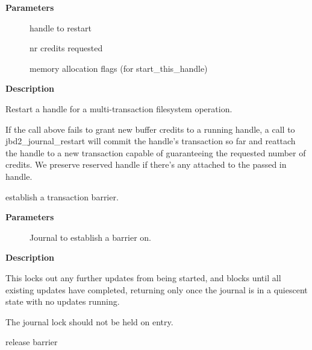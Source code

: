 \documentclass[a4paper,8pt,english]{sphinxmanual}
\begin{document}
\textbf{Parameters}
\begin{description}
\item[{}] \leavevmode
handle to restart

\item[{}] \leavevmode
nr credits requested

\item[{}] \leavevmode
memory allocation flags (for start\_this\_handle)

\end{description}

\textbf{Description}

Restart a handle for a multi-transaction filesystem
operation.

If the {\hyperref[filesystems/index:c.jbd2_journal_extend]{\emph{}}} call above fails to grant new buffer credits
to a running handle, a call to jbd2\_journal\_restart will commit the
handle's transaction so far and reattach the handle to a new
transaction capable of guaranteeing the requested number of
credits. We preserve reserved handle if there's any attached to the
passed in handle.

\begin{fulllineitems}
\label{filesystems/index:c.jbd2_journal_lock_updates}
establish a transaction barrier.

\end{fulllineitems}


\textbf{Parameters}
\begin{description}
\item[{}] \leavevmode
Journal to establish a barrier on.

\end{description}

\textbf{Description}

This locks out any further updates from being started, and blocks
until all existing updates have completed, returning only once the
journal is in a quiescent state with no updates running.

The journal lock should not be held on entry.

\begin{fulllineitems}
\label{filesystems/index:c.jbd2_journal_unlock_updates}
release barrier

\end{fulllineitems}
\end{document}
